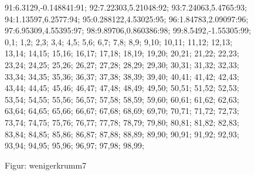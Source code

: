 \documentclass[a4paper,10pt,ngerman]{scrartcl}
\begin{document}
\begin{figure}
{    91:6.3129,-0.148841:91;
    92:7.22303,5.21048:92;
    93:7.24063,5.4765:93;
    94:1.13597,6.2577:94;
    95:0.288122,4.53025:95;
    96:1.84783,2.09097:96;
    97:6.95309,4.55395:97;
    98:9.89706,0.860386:98;
    99:8.5492,-1.55305:99;
}{
0,1;
1,2;
2,3;
3,4;
4,5;
5,6;
6,7;
7,8;
8,9;
9,10;
10,11;
11,12;
12,13;
13,14;
14,15;
15,16;
16,17;
17,18;
18,19;
19,20;
20,21;
21,22;
22,23;
23,24;
24,25;
25,26;
26,27;
27,28;
28,29;
29,30;
30,31;
31,32;
32,33;
33,34;
34,35;
35,36;
36,37;
37,38;
38,39;
39,40;
40,41;
41,42;
42,43;
43,44;
44,45;
45,46;
46,47;
47,48;
48,49;
49,50;
50,51;
51,52;
52,53;
53,54;
54,55;
55,56;
56,57;
57,58;
58,59;
59,60;
60,61;
61,62;
62,63;
63,64;
64,65;
65,66;
66,67;
67,68;
68,69;
69,70;
70,71;
71,72;
72,73;
73,74;
74,75;
75,76;
76,77;
77,78;
78,79;
79,80;
80,81;
81,82;
82,83;
83,84;
84,85;
85,86;
86,87;
87,88;
88,89;
89,90;
90,91;
91,92;
92,93;
93,94;
94,95;
95,96;
96,97;
97,98;
98,99;
}
\caption{Figur: wenigerkrumm7}
        \label{fig:wenigerkrumm7}
    \end{figure}
\newpage
\end{document}
